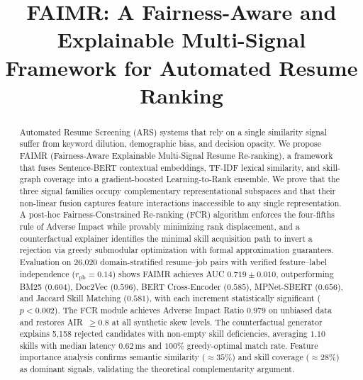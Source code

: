 \documentclass[smallcondensed,numbers]{sn-jnl}
\begin{document}
\title[FAIMR: Fairness-Aware Resume Ranking]{FAIMR: A Fairness-Aware and Explainable Multi-Signal Framework for Automated Resume Ranking}

\author*[1]{ }
\author[1]{ }


\maketitle

\begin{abstract}
Automated Resume Screening (ARS) systems that rely on a single similarity signal suffer from keyword dilution, demographic bias, and decision opacity. We propose FAIMR (Fairness-Aware Explainable Multi-Signal Resume Re-ranking), a framework that fuses Sentence-BERT contextual embeddings, TF-IDF lexical similarity, and skill-graph coverage into a gradient-boosted Learning-to-Rank ensemble. We prove that the three signal families occupy complementary representational subspaces and that their non-linear fusion captures feature interactions inaccessible to any single representation. A post-hoc Fairness-Constrained Re-ranking (FCR) algorithm enforces the four-fifths rule of Adverse Impact while provably minimizing rank displacement, and a counterfactual explainer identifies the minimal skill acquisition path to invert a rejection via greedy submodular optimization with formal approximation guarantees. Evaluation on 26,020 domain-stratified resume--job pairs with verified feature--label independence ($r_{\mathrm{pb}}{=}0.14$) shows FAIMR achieves AUC $0.719 \pm 0.010$, outperforming BM25 ($0.604$), Doc2Vec ($0.596$), BERT Cross-Encoder ($0.585$), MPNet-SBERT ($0.656$), and Jaccard Skill Matching ($0.581$), with each increment statistically significant ($p < 0.002$). The FCR module achieves Adverse Impact Ratio $0.979$ on unbiased data and restores AIR~$\geq 0.8$ at all synthetic skew levels. The counterfactual generator explains 5,158 rejected candidates with non-empty skill deficiencies, averaging $1.10$ skills with median latency $0.62$\,ms and $100\%$ greedy-optimal match rate. Feature importance analysis confirms semantic similarity ($\approx 35\%$) and skill coverage ($\approx 28\%$) as dominant signals, validating the theoretical complementarity argument.
\end{abstract}
\end{document}

